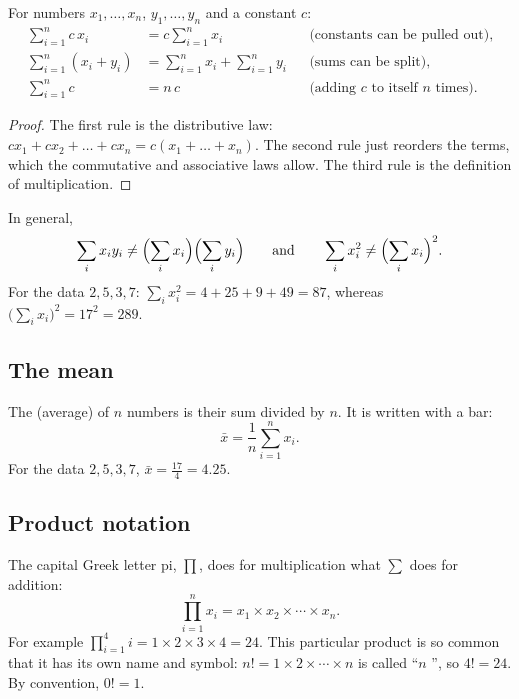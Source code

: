 \begin{proposition}\label{prop:sum-rules}
For numbers $x_1,\dots,x_n$, $y_1, \dots, y_n$ and a constant $c$:
\begin{align*}
  \sum_{i=1}^{n} c\,x_i &= c\sum_{i=1}^{n} x_i
    && \text{(constants can be pulled out)},\\
  \sum_{i=1}^{n} (x_i + y_i) &= \sum_{i=1}^{n} x_i + \sum_{i=1}^{n} y_i
    && \text{(sums can be split)},\\
  \sum_{i=1}^{n} c &= n\,c
    && \text{(adding $c$ to itself $n$ times)}.
\end{align*}
\end{proposition}

\begin{proof}
The first rule is the distributive law:
$c x_1 + c x_2 + \dots + c x_n = c(x_1 + \dots + x_n)$. The second rule just
reorders the terms, which the commutative and associative laws allow. The
third rule is the definition of multiplication.
\end{proof}

\begin{pitfall}
In general,
\[
  \sum_i x_i y_i \neq \Bigl(\sum_i x_i\Bigr)\Bigl(\sum_i y_i\Bigr)
  \qquad\text{and}\qquad
  \sum_i x_i^2 \neq \Bigl(\sum_i x_i\Bigr)^2 .
\]
For the data $2, 5, 3, 7$: $\sum_i x_i^2 = 4 + 25 + 9 + 49 = 87$, whereas
$\bigl(\sum_i x_i\bigr)^2 = 17^2 = 289$.
\end{pitfall}

\subsection{The mean}

The  (average) of $n$ numbers is their sum divided by $n$. It
is written with a bar:
\[
  \bar x = \frac{1}{n}\sum_{i=1}^{n} x_i .
\]
For the data $2, 5, 3, 7$, $\bar x = \tfrac{17}{4} = 4.25$.

\subsection{Product notation}

The capital Greek letter pi, $\prod$, does for multiplication what $\sum$ does
for addition:
\[
  \prod_{i=1}^{n} x_i = x_1 \times x_2 \times \cdots \times x_n .
\]
For example $\prod_{i=1}^{4} i = 1\times2\times3\times4 = 24$. This
particular product is so common that it has its own name and symbol:
$n! = 1 \times 2 \times \cdots \times n$ is called ``$n$
'', so $4! = 24$. By convention, $0! = 1$.

